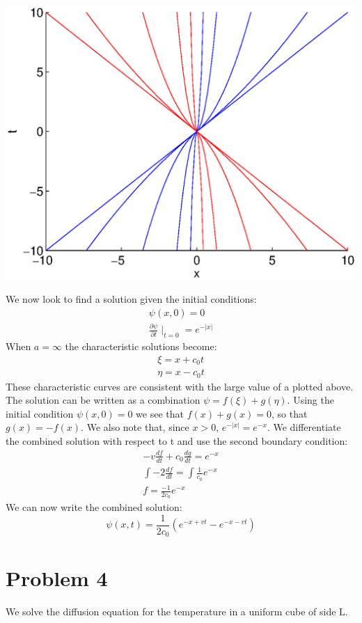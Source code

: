 \documentclass[a4paper,10pt]{article}
\numberwithin{equation}{section}
\begin{document}
\includegraphics{p3chars}

We now look to find a solution given the initial conditions:
\begin{gather}
\psi(x,0)=0\\
\frac{\partial \psi}{\partial t}\mid_{t=0}=e^{-|x|}
\end{gather}
When $a=\infty$ the characteristic solutions become:
\begin{gather}
\xi=x+c_0t\\
\eta=x-c_0t
\end{gather}
These characteristic curves are consistent with the large value of a plotted above.
The solution can be written as a combination $\psi=f(\xi)+g(\eta)$. 
Using the initial condition $\psi(x,0)=0$ we see that $f(x)+g(x)=0$, so that $g(x)=-f(x)$.
We also note that, since $x>0$, $e^{-|x|}=e^{-x}$.
We differentiate the combined solution with respect to t and use the second boundary condition:
\begin{gather}
-v\frac{df}{dt}+c_0\frac{dg}{dt}=e^{-x}\\
\int-2\frac{df}{dt}=\int\frac{1}{c_0}e^{-x}\\
f=\frac{-1}{2c_0}e^{-x}
\end{gather}
We can now write the combined solution:
\begin{equation}
\psi(x,t)=\frac{1}{2c_0}(e^{-x+vt}-e^{-x-vt}) 
\end{equation}

\section{Problem 4}
We solve the diffusion equation for the temperature in a uniform cube of side L.
\end{document}
